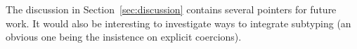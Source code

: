 \documentclass[acmsmall,review,anonymous,screen]{acmart}
\begin{document}
The discussion in Section~\ref{sec:discussion} contains several
pointers for future work. It would also be interesting to investigate
ways to integrate subtyping (an obvious one being the insistence on
explicit coercions).






\end{document}
